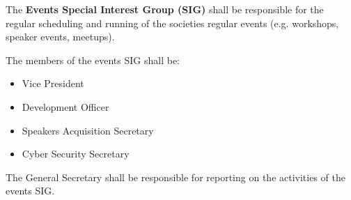\begin{clause}
    The \textbf{Events Special Interest Group (SIG)} shall be responsible for the regular scheduling and running of the societies regular events (e.g. workshops, speaker events, meetups).
\end{clause}

\begin{subclause}
    The members of the events SIG shall be:
    \begin{itemize}[label=--,topsep=0em,itemsep=0em]
        \item Vice President
        \item Development Officer
        \item Speakers Acquisition Secretary
        \item Cyber Security Secretary
    \end{itemize}
\end{subclause}

\begin{subclause}
    The General Secretary shall be responsible for reporting on the activities of the events SIG.
\end{subclause}